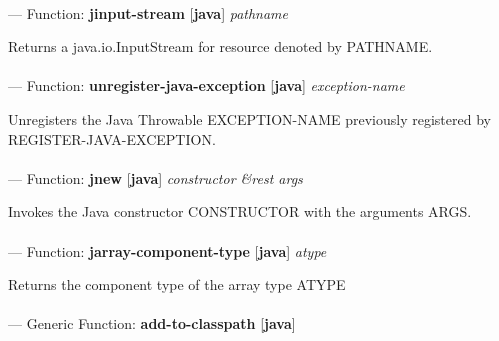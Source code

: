 \paragraph{}
\label{JAVA:JINPUT-STREAM}
--- Function: \textbf{jinput-stream} [\textbf{java}] \textit{pathname}

\begin{adjustwidth}{5em}{5em}
Returns a java.io.InputStream for resource denoted by PATHNAME.
\end{adjustwidth}

\paragraph{}
\label{JAVA:UNREGISTER-JAVA-EXCEPTION}
--- Function: \textbf{unregister-java-exception} [\textbf{java}] \textit{exception-name}

\begin{adjustwidth}{5em}{5em}
Unregisters the Java Throwable EXCEPTION-NAME previously registered by REGISTER-JAVA-EXCEPTION.
\end{adjustwidth}

\paragraph{}
\label{JAVA:JNEW}
--- Function: \textbf{jnew} [\textbf{java}] \textit{constructor \&rest args}

\begin{adjustwidth}{5em}{5em}
Invokes the Java constructor CONSTRUCTOR with the arguments ARGS.
\end{adjustwidth}

\paragraph{}
\label{JAVA:JARRAY-COMPONENT-TYPE}
--- Function: \textbf{jarray-component-type} [\textbf{java}] \textit{atype}

\begin{adjustwidth}{5em}{5em}
Returns the component type of the array type ATYPE
\end{adjustwidth}

\paragraph{}
\label{JAVA:ADD-TO-CLASSPATH}
--- Generic Function: \textbf{add-to-classpath} [\textbf{java}] \textit{}

